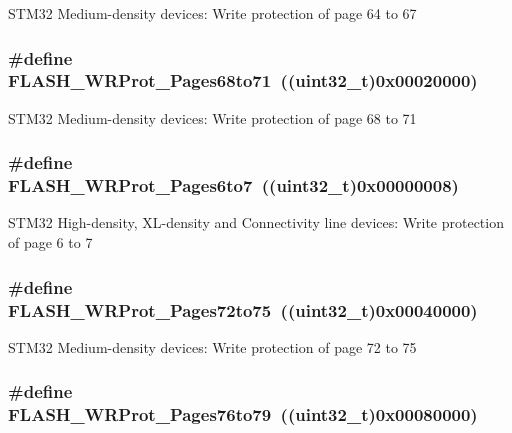 STM32 Medium-\/density devices: Write protection of page 64 to 67 \hypertarget{group__Option__Bytes__Write__Protection_gafbb813885c6cd505c64083f2f88532fb}{
\subsubsection[{FLASH\_\-WRProt\_\-Pages68to71}]{\setlength{\rightskip}{0pt plus 5cm}\#define FLASH\_\-WRProt\_\-Pages68to71~((uint32\_\-t)0x00020000)}}
\label{group__Option__Bytes__Write__Protection_gafbb813885c6cd505c64083f2f88532fb}
STM32 Medium-\/density devices: Write protection of page 68 to 71 \hypertarget{group__Option__Bytes__Write__Protection_ga289b919ff7f6e7287facf108b8b94619}{
\subsubsection[{FLASH\_\-WRProt\_\-Pages6to7}]{\setlength{\rightskip}{0pt plus 5cm}\#define FLASH\_\-WRProt\_\-Pages6to7~((uint32\_\-t)0x00000008)}}
\label{group__Option__Bytes__Write__Protection_ga289b919ff7f6e7287facf108b8b94619}
STM32 High-\/density, XL-\/density and Connectivity line devices: Write protection of page 6 to 7 \hypertarget{group__Option__Bytes__Write__Protection_ga1a19c52012bbb30f3ae1599fa5a200cc}{
\subsubsection[{FLASH\_\-WRProt\_\-Pages72to75}]{\setlength{\rightskip}{0pt plus 5cm}\#define FLASH\_\-WRProt\_\-Pages72to75~((uint32\_\-t)0x00040000)}}
\label{group__Option__Bytes__Write__Protection_ga1a19c52012bbb30f3ae1599fa5a200cc}
STM32 Medium-\/density devices: Write protection of page 72 to 75 \hypertarget{group__Option__Bytes__Write__Protection_ga9e1f9abfa57766312c6cbae9b42f3ab6}{
\subsubsection[{FLASH\_\-WRProt\_\-Pages76to79}]{\setlength{\rightskip}{0pt plus 5cm}\#define FLASH\_\-WRProt\_\-Pages76to79~((uint32\_\-t)0x00080000)}}
